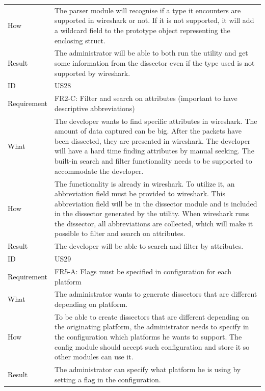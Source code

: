 \begin{table}[htbp]
{\begin{tabularx}{1.2\textwidth}{l X}
	How & The \gls{parser} module will recognise if a type it encounters are supported in \Gls{wireshark} or not. If it is not supported, it will add a \gls{wildcard} field to the prototype object
	representing the enclosing \gls{struct}. \\
	Result & The administrator will be able to both run the \gls{utility} and get some information from the \gls{dissector} even if the type used is not supported by \Gls{wireshark}. \\
	\midrule
	ID & US28 \\
	Requirement & FR2-C: Filter and search on attributes (important to have descriptive abbreviations) \\
	What & The developer wants to find specific attributes in \Gls{wireshark}. The amount of data captured can be big.
	After the \glspl{packet} have been dissected, they are presented in \Gls{wireshark}. The developer will have a hard time finding 
	attributes by manual seeking. The built-in search and filter functionality needs to be supported to accommodate the developer. \\
	How & The functionality is already in \Gls{wireshark}. To utilize it, an abbreviation field must be provided to \Gls{wireshark}. This abbreviation field will be in the \gls{dissector} module
	and is included in the \gls{dissector} generated by the \gls{utility}. When \Gls{wireshark} runs the \gls{dissector}, all abbreviations are collected, which will make it possible to filter and search
	on attributes. \\
	Result & The developer will be able to search and filter by attributes. \\
	\midrule
	ID & US29 \\
	Requirement & FR5-A: Flags must be specified in configuration for each platform \\
	What & The administrator wants to generate \glspl{dissector} that are different depending on platform. \\
	How & To be able to create \glspl{dissector} that are different depending on the originating platform, the administrator needs to specify in the configuration which platforms he wants to support.
	The config module should accept such configuration and store it so other modules can use it. \\ 
	Result & The administrator can specify what platform he is using by setting a flag in the configuration. \\
	\midrule
\end{tabularx}}
\end{table}

